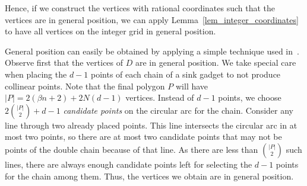 \documentclass[a4paper,11pt]{article}
\begin{document}
Hence, if we construct the vertices with rational coordinates such that the vertices are in general position, we can apply Lemma~\ref{lem_integer_coordinates} to have all vertices on the integer grid in general position.

General position can easily be obtained by applying a simple technique used in~\cite[Appendix~A]{point_set_hard}.
Observe first that the vertices of $D$ are in general position.
We take special care when placing the $d-1$ points of each chain of a sink gadget to not produce collinear points.
Note that the final polygon $P$ will have $|P|= 2(\beta n + 2) + 2N (d-1)$ vertices.
Instead of $d-1$ points, we choose $2\binom{|P|}{2} + d - 1$ \emph{candidate points} on the circular arc for the chain.
Consider any line through two already placed points.
This line intersects the circular arc in at most two points, so there are at most two candidate points that may not be points of the double chain because of that line.
As there are less than $\binom{|P|}{2}$ such lines, there are always enough candidate points left for selecting the $d-1$ points for the chain among them.
Thus, the vertices we obtain are in general position.
\end{document}

